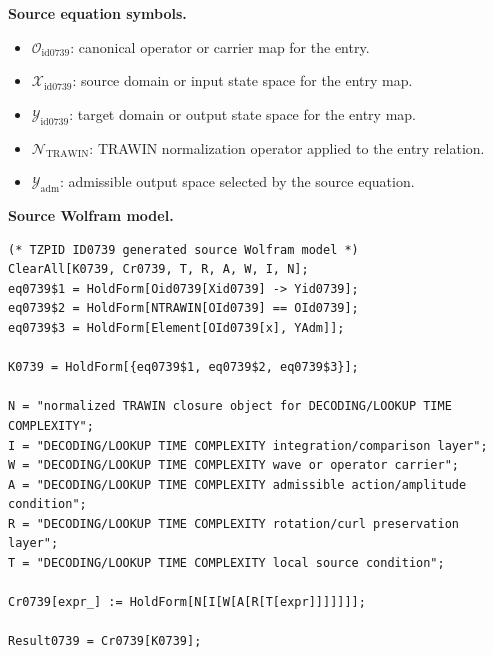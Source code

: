 \begin{minipage}[t]{0.49\linewidth}
\begingroup
\small
\raggedright
\textbf{Source equation symbols.}\par
\begin{itemize}[leftmargin=1.35em,itemsep=1pt,topsep=1pt,parsep=0pt]
    \item $\mathcal{O}_{\mathrm{id0739}}$: canonical operator or carrier map for the entry.
    \item $\mathcal{X}_{\mathrm{id0739}}$: source domain or input state space for the entry map.
    \item $\mathcal{Y}_{\mathrm{id0739}}$: target domain or output state space for the entry map.
    \item $\mathcal{N}_{\mathrm{TRAWIN}}$: TRAWIN normalization operator applied to the entry relation.
    \item $\mathcal{Y}_{\mathrm{adm}}$: admissible output space selected by the source equation.
\end{itemize}
\endgroup
\end{minipage}\hfill
\begin{minipage}[t]{0.47\linewidth}
\begingroup
\scriptsize
\raggedright
\textbf{Source Wolfram model.}\par
\begin{Verbatim}[fontsize=\tiny,breaklines=true,breakanywhere=true]
(* TZPID ID0739 generated source Wolfram model *)
ClearAll[K0739, Cr0739, T, R, A, W, I, N];
eq0739$1 = HoldForm[Oid0739[Xid0739] -> Yid0739];
eq0739$2 = HoldForm[NTRAWIN[OId0739] == OId0739];
eq0739$3 = HoldForm[Element[OId0739[x], YAdm]];

K0739 = HoldForm[{eq0739$1, eq0739$2, eq0739$3}];

N = "normalized TRAWIN closure object for DECODING/LOOKUP TIME COMPLEXITY";
I = "DECODING/LOOKUP TIME COMPLEXITY integration/comparison layer";
W = "DECODING/LOOKUP TIME COMPLEXITY wave or operator carrier";
A = "DECODING/LOOKUP TIME COMPLEXITY admissible action/amplitude condition";
R = "DECODING/LOOKUP TIME COMPLEXITY rotation/curl preservation layer";
T = "DECODING/LOOKUP TIME COMPLEXITY local source condition";

Cr0739[expr_] := HoldForm[N[I[W[A[R[T[expr]]]]]]];

Result0739 = Cr0739[K0739];
\end{Verbatim}
\endgroup
\end{minipage}

